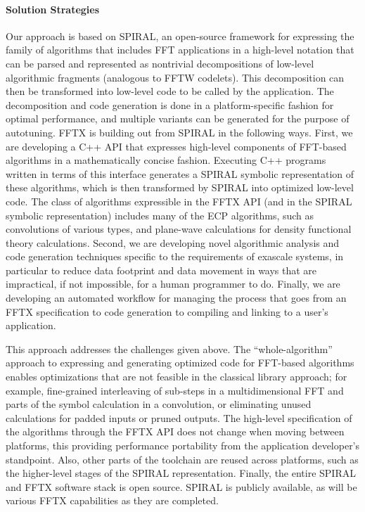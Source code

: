 \paragraph{Solution Strategies}
Our approach is based on SPIRAL, an open-source framework for expressing the family of algorithms that includes FFT applications in a high-level notation that can be parsed and represented as nontrivial decompositions of low-level algorithmic fragments (analogous to FFTW codelets). This decomposition can then be transformed into low-level code to be called by the application. The decomposition and code generation is done in a platform-specific fashion for optimal performance, and multiple variants can be generated for the purpose of autotuning.
FFTX is building out from SPIRAL in the following ways.
First, we are developing a C++ API that expresses high-level components of FFT-based algorithms in a mathematically concise fashion. Executing C++ programs written in terms of this interface generates a SPIRAL symbolic representation of these algorithms, which is then transformed by SPIRAL into optimized low-level code. The class of algorithms expressible in the FFTX API (and in the SPIRAL symbolic representation) includes many of the ECP algorithms, such as convolutions of various types, and plane-wave calculations for density functional theory calculations. Second, we are developing novel algorithmic analysis and code generation techniques specific to the requirements of exascale systems, in particular to reduce data footprint and data movement in ways that are impractical, if not impossible, for a human programmer to do. Finally, we are developing an automated workflow for managing the process that goes from an FFTX specification to code generation to compiling and linking to a user's application. 

This approach addresses the challenges given above. The ``whole-algorithm'' approach to expressing and generating optimized code for FFT-based algorithms enables optimizations that are not feasible in the classical library approach; for example, fine-grained interleaving of sub-steps in a multidimensional FFT and parts of the symbol calculation in a convolution, or eliminating unused calculations for padded inputs or pruned outputs. The high-level specification of the algorithms through the FFTX API does not change when moving between platforms, this providing performance portability from the application developer's standpoint. Also, other parts of the toolchain are reused across platforms, such as the higher-level stages of the SPIRAL representation. Finally, the entire SPIRAL and FFTX software stack is open source. SPIRAL is publicly available, as will be various FFTX capabilities as they are completed.




